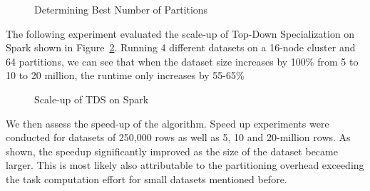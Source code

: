 \documentclass[11pt]{article}       %
\begin{document}
\begin{figure}[htp]
\centering
{}
\caption{Determining Best Number of Partitions}
\label{bestPartition}
\end{figure}

The following experiment evaluated the scale-up of Top-Down Specialization on Spark shown in Figure~\ref{scaleUp}. Running 4 different datasets on a 16-node cluster and 64 partitions, we can see that when the dataset size increases by 100\% from 5 to 10 to 20 million, the runtime only increases by 55-65\%

\begin{figure}[h]
\centering
{}
\caption{Scale-up of TDS on Spark}
\label{scaleUp}
\end{figure}

We then assess the speed-up of the algorithm. Speed up experiments were conducted for datasets of 250,000 rows as well as 5, 10 and 20-million rows. As shown, the speedup significantly improved as the size of the dataset became larger. This is most likely also attributable to the partitioning overhead exceeding the task computation effort for small datasets mentioned before. 
\end{document}
